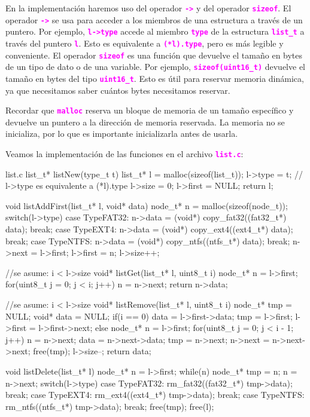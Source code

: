 \documentclass[]{scrartcl}
\newcommand{\hl}[1]{\textcolor{magenta}{\textbf{\texttt{#1}}}}
\begin{document}
En la implementación haremos uso del operador \hl{->} y del operador \hl{sizeof}. El operador \hl{->} se usa para acceder a los miembros de una estructura a través de un puntero. Por ejemplo, \hl{l->type} accede al miembro \hl{type} de la estructura \hl{list\_t} a través del puntero \hl{l}. Esto es equivalente a \hl{(*l).type}, pero es más legible y conveniente. El operador \hl{sizeof} es una función que devuelve el tamaño en bytes de un tipo de dato o de una variable. Por ejemplo, \hl{sizeof(uint16\_t)} devuelve el tamaño en bytes del tipo \hl{uint16\_t}. Esto es útil para reservar memoria dinámica, ya que necesitamos saber cuántos bytes necesitamos reservar.

Recordar que \hl{malloc} reserva un bloque de memoria de un tamaño específico y devuelve un puntero a la dirección de memoria reservada. La memoria no se inicializa, por lo que es importante inicializarla antes de usarla.

Veamos la implementación de las funciones en el archivo \hl{list.c}:

\begin{cbox}[breakable]{list.c}
  list_t* listNew(type_t t) {
    list_t* l = malloc(sizeof(list_t));
    l->type = t;  // l->type es equivalente a (*l).type
    l->size = 0;
    l->first = NULL;
    return l;
  }

  void listAddFirst(list_t* l, void* data) {
    node_t* n = malloc(sizeof(node_t));
    switch(l->type) {
      case TypeFAT32:
        n->data = (void*) copy_fat32((fat32_t*) data);
        break;
      case TypeEXT4:
        n->data = (void*) copy_ext4((ext4_t*) data);
        break;
      case TypeNTFS:
        n->data = (void*) copy_ntfs((ntfs_t*) data);
        break;
    }
    n->next = l->first;
    l->first = n;
    l->size++;
  }

  //se asume: i < l->size
  void* listGet(list_t* l, uint8_t i){
    node_t* n = l->first;
    for(uint8_t j = 0; j < i; j++)
      n = n->next;
    return n->data;
  }

  //se asume: i < l->size
  void* listRemove(list_t* l, uint8_t i){
    node_t* tmp = NULL;
    void* data = NULL;
    if(i == 0){
      data = l->first->data;
      tmp = l->first;
      l->first = l->first->next;
    }else{
      node_t* n = l->first;
      for(uint8_t j = 0; j < i - 1; j++)
        n = n->next;
      data = n->next->data;
      tmp = n->next;
      n->next = n->next->next;
    }
    free(tmp);
    l->size--;
    return data;
  }

  void listDelete(list_t* l){
    node_t* n = l->first;
    while(n){
      node_t* tmp = n;
      n = n->next;
      switch(l->type) {
        case TypeFAT32:
          rm_fat32((fat32_t*) tmp->data);
          break;
        case TypeEXT4:
          rm_ext4((ext4_t*) tmp->data);
          break;
        case TypeNTFS:
          rm_ntfs((ntfs_t*) tmp->data);
          break;
      }
      free(tmp);
    }
    free(l);
  }
\end{cbox}
\end{document}
